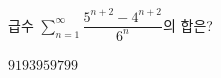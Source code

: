 급수 $\displaystyle\sum_{n=1}^{\infty} \dfrac{5^{n+2}-4^{n+2}}{6^n}$의 합은?
\begin{choices32}{$91$}{$93$}{$95$}{$97$}{$99$}\end{choices32}
